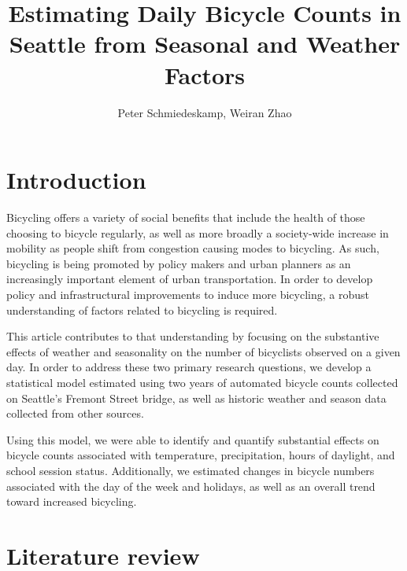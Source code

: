 \documentclass[12pt,letterpaper,article,twocolumn]{memoir}
\title{Estimating Daily Bicycle Counts in Seattle from Seasonal and Weather Factors}
\author{Peter Schmiedeskamp, Weiran Zhao}
\begin{document}
\maketitle

\section*{Introduction}
%
% 

Bicycling offers a variety of social benefits that include the health
of those choosing to bicycle regularly, as well as more broadly a
society-wide increase in mobility as people shift from congestion
causing modes to bicycling. As such, bicycling is being promoted by
policy makers and urban planners as an increasingly important element
of urban transportation. In order to develop policy and
infrastructural improvements to induce more bicycling, a robust
understanding of factors related to bicycling is required.

This article contributes to that understanding by focusing on the
substantive effects of weather and seasonality on the number of
bicyclists observed on a given day. In order to address these two
primary research questions, we develop a statistical model estimated
using two years of automated bicycle counts collected on Seattle's
Fremont Street bridge, as well as historic weather and season data
collected from other sources.

Using this model, we were able to identify and quantify substantial
effects on bicycle counts associated with temperature, precipitation,
hours of daylight, and school session status. Additionally, we
estimated changes in bicycle numbers associated with the day of the
week and holidays, as well as an overall trend toward increased
bicycling.

\section*{Literature review}
% 
% 
\end{document}
